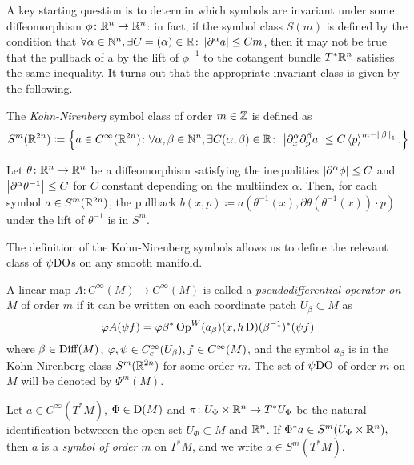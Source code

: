 A key starting question is to determin which symbols are invariant under some diffeomorphism $\phi\colon\mathbb{R}^{n}\to\mathbb{R}^{n}$: in fact, if the symbol class $S(m)$ is defined by the condition that $\forall\alpha\in\mathbb{N}^{n},\exists C=(\alpha)\in\mathbb{R}\colon\left| \partial^{\alpha}a\right|\leq Cm$, then it may not be true that the pullback of a by the lift of $\phi^{-1}$ to the cotangent bundle $T^{\ast}\mathbb{R}^{n}$ satisfies the same inequality. It turns out that the appropriate invariant class is given by the following.

\begin{defin}
\label{def:symbols_true} The \emph{Kohn-Nirenberg} symbol class of order $m\in\mathbb{Z}$ is defined as
\[
S^{m}(\mathbb{R}^{2n})\coloneqq\left\{
a\in C^{\infty}(\mathbb{R}^{2n})\colon\forall\alpha,\beta\in\mathbb{N}^{n},\exists C(\alpha,\beta)\in\mathbb{R}\colon\,\left| \partial_{x}^{\alpha}\partial_{p}^{\beta}a\right|\leq C\left< p\right>^{m-\left\lVert \beta\right\rVert_{1}}.
\right\}
\]
\end{defin}

\begin{nteo}
Let $\theta\colon\mathbb{R}^{n}\to\mathbb{R}^{n}$ be a diffeomorphism satisfying the inequalities $\left| \partial^{\alpha}\phi\right|\leq C$ and $\left| \partial^{\alpha}\theta^{-1}\right|\leq C$ for $C$ constant depending on the multiindex $\alpha$. Then, for each symbol $a\in S^{m}(\mathbb{R}^{2n})$, the pullback $b(x,p)\coloneqq a(\theta^{-1}(x),\partial\theta(\theta^{-1}(x))\cdot p)$ under the lift of $\theta^{-1}$ is in $S^{m}$. 
\end{nteo}

The definition of the Kohn-Nirenberg symbols allows us to define the relevant class of $\PDO$s on any smooth manifold.

\begin{defin}[$\PDO$ on $M$]
\label{def:pdo_on_manifolds}
A linear map $A\colon C^{\infty}(M)\to C^{\infty}(M)$ is called a \emph{pseudodifferential operator on $M$} of order $m$ if it can be written on each coordinate patch $U_{\beta}\subset M$ as 
\[
\varphi A(\psi f)=\varphi\beta^{\ast}\operatorname{Op}^{W}(a_{\beta})(x,h\operatorname{D})(\beta^{-1})^{\ast}(\psi f)
\]
where $\beta\in\operatorname{Diff}(M)$, $\varphi,\psi\in C^{\infty}_{c}(U_{\beta}), f\in C^{\infty}(M)$, and the symbol $a_{\beta}$ is in the Kohn-Nirenberg class $S^{m}(\mathbb{R}^{2n})$ for some order $m$. The set of $\PDO$ of order $m$ on $M$ will be denoted by $\Psi^{m}(M)$.
\end{defin}

\begin{defin}
Let $a\in C^{\infty}(T^{\ast} M)$, $\Phi\in\operatorname{D}(M)$ and $\pi\colon U_{\Phi}\times\mathbb{R}^{n}\to T^{\ast}U_{\Phi}$ be the natural identification betweeen the open set $U_{\Phi}\subset M$ and $\mathbb{R}^{n}$. If $\Phi^{\ast}a\in S^{m}(U_{\Phi}\times\mathbb{R}^{n}),$ then $a$ is a \emph{symbol of order} $m$ on $T^{\ast}M$, and we write $a\in S^{m}(T^{\ast}M)$. 
\end{defin}

